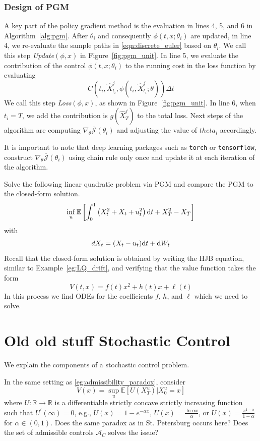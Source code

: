 \documentclass[11pt]{book}
\newcommand{\dt}{\text{\normalfont d}t}
\newcommand{\dW}{\text{\normalfont d}W}
\begin{document}
\subsection{Design of PGM}
A key part of the policy gradient method is the evaluation in lines 4, 5, and 6 in Algorithm~\ref{alg:pgm}. After $\theta_i$ and consequently $\phi(t,x;\theta_i)$ are updated, in line 4, we  re-evaluate the sample paths in \eqref{eqn:discrete_euler} based on $\theta_i$. 
We call this step \emph{Update$(\phi,x)$} in Figure~\ref{fig:pgm_unit}. In line 5, we evaluate the contribution of the control $\phi(t,x;\theta_i)$ to the running cost in the loss function by evaluating
\[
C(t_{i},\hat{X}^j_{t_i},\phi(t_{i},\hat{X}^j_{t_{i}};\theta))\Delta t
\]
We call this step \emph{Loss$(\phi,x)$}, as shown in Figure~\ref{fig:pgm_unit}. In line 6, when $t_i=T$, we add the contribution is $g(\hat{X}^j_T)$ to the total loss. Next steps of the algorithm are computing $\nabla_\theta \overline{\mathcal{J}}(\theta_{i})$ and adjusting the value of $theta_i$ accordingly. 

It is important to note that deep learning packages such as \verb|torch| or \verb|tensorflow|, construct $\nabla_\theta \overline{\mathcal{J}}(\theta_{i})$ using chain rule only once and update it at each iteration of the algorithm. 

\begin{ex}
    Solve the following linear quadratic problem via PGM and compare the PGM to the closed-form solution.
    \[
    \inf_u\mathbb{E}\left[\int_0^1\left(X_t^2+X_t+u_t^2\right)\dt + X_T^2 -X_T\right]
    \]
    with
    \[
    dX_t=(X_t-u_t)\dt+\dW_t
    \]
Recall that the closed-form solution is obtained by writing the HJB equation, similar to Example~\ref{eg:LQ_drift}, and verifying that the value function takes the form 
\[
V(t,x)=f(t)x^2+h(t)x+\ell(t)
\]
In this process we find ODEs for the coefficients $f$, $h$, and $\ell$ which we need to solve.
\end{ex}
\chapter{Old old stuff Stochastic Control}
We explain the components of a stochastic control problem.

\begin{ex}
    In the same setting as \ref{eg:admissibility_paradox}, consider
    \begin{equation}\label{prob:merton}
        V(x) = \sup_{u}\mathbb{E}[U(X_T^u)|X^u_0=x]
    \end{equation}
    where $U:\mathbb{R}\to\mathbb{R}$ is a differentiable strictly concave strictly increasing function such that $U^\prime(\infty)=0$, e.g., $U(x)=1-e^{-\alpha x}$, $U(x) = \frac{\ln \alpha x}{\alpha}$, or $U(x) = \frac{x^{1-\alpha}}{1-\alpha}$ for $\alpha\in(0,1)$.
    Does the same paradox as in St. Petersburg occurs here?
    Does the set of admissible controls $\mathcal{A}_C$ solves the issue?
\end{ex}
\end{document}
